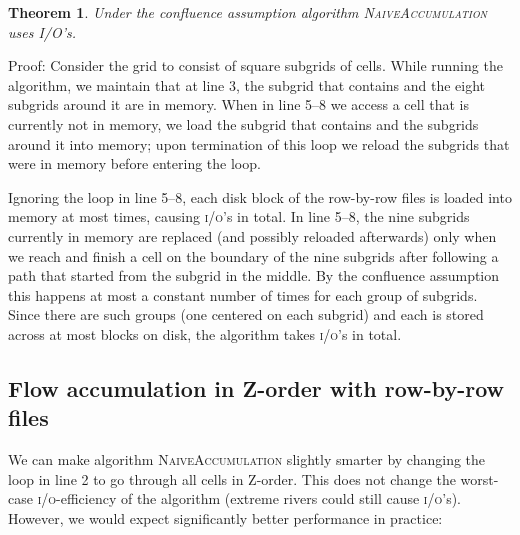 \documentclass[10pt,a4paper]{article}
\newtheorem{theorem}{Theorem}
\newenvironment{proof}{Proof:}{\qed}
\def\squareforqed{\hbox{\rlap{}}}
\def\qed{\ifmmode\squareforqed\else{\unskip\nobreak\hfil
\penalty50\hskip1em\null\nobreak\hfil\squareforqed
\parfillskip=0pt\finalhyphendemerits=0\endgraf}\fi}
\def\io{\textsc{i/o}\xspace}
\def\ios{\textsc{i/o}'s\xspace}
\begin{document}
\begin{theorem}\label{NaiveAccumulationRonR}
Under the confluence assumption algorithm \textsc{NaiveAccumulation} uses  I/O's.
\end{theorem}
\begin{proof}
Consider the grid to consist of square subgrids of  cells.
While running the algorithm, we maintain that at line 3, the subgrid that contains  and the eight subgrids around it are in memory. When in line 5--8 we access a cell  that is currently not in memory, we load the subgrid that contains  and the subgrids around it into memory; upon termination of this loop we reload the subgrids that were in memory before entering the loop.

Ignoring the loop in line 5--8, each disk block of the row-by-row files is loaded into memory at most  times, causing  \ios in total. In line 5--8, the nine subgrids currently in memory are replaced (and possibly reloaded afterwards) only when we reach and finish a cell on the boundary of the nine subgrids after following a path that started from the subgrid in the middle. By the confluence assumption this happens at most a constant number of times for each group of  subgrids. Since there are  such groups (one centered on each subgrid) and each is stored across at most  blocks on disk, the algorithm takes  \ios in total.
\end{proof}

\subsection{Flow accumulation in Z-order with row-by-row files}

We can make algorithm \textsc{NaiveAccumulation} slightly smarter by changing the loop in line 2 to go through all cells in Z-order. This does not change the worst-case \io-efficiency of the algorithm (extreme rivers could still cause  \ios). However, we would expect significantly better performance in practice:
\end{document}
